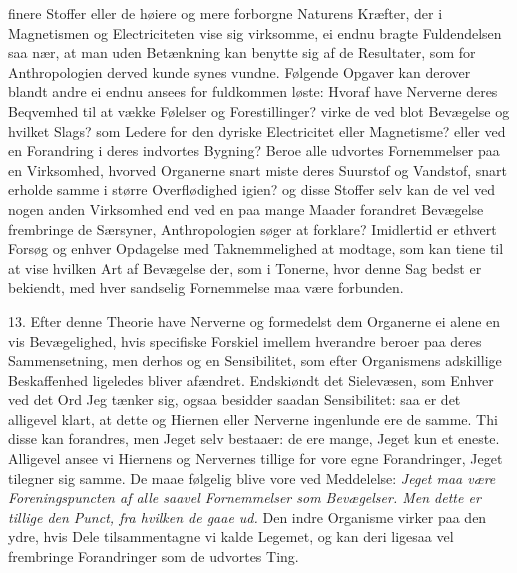 \documentclass[12pt,a4paper]{article}
\newcommand{\opage}[1]{\marginnote{\footnotesize\textit{[#1]}}}
\begin{document}
finere Stoffer eller de høiere og mere forborgne Naturens Kræfter, der i Magnetismen og
Electriciteten vise sig virksomme, ei endnu bragte Fuldendelsen saa nær, at man uden
Betænkning kan benytte sig af de Resultater, som for Anthropologien derved kunde synes
vundne. Følgende Opgaver kan derover blandt andre ei endnu ansees for fuldkommen løste:
Hvoraf have Nerverne deres Beqvemhed til at vække Følelser og Forestillinger? virke de
ved blot Bevægelse og hvilket Slags? som Ledere for den dyriske
\opage{81} Electricitet eller Magnetisme? eller ved en Forandring i deres indvortes Bygning? Beroe
alle udvortes Fornemmelser paa en Virksomhed, hvorved Organerne snart miste deres
Suurstof og Vandstof, snart erholde samme i større Overflødighed igien? og disse Stoffer
selv kan de vel ved nogen anden Virksomhed end ved en paa mange Maader forandret
Bevægelse frembringe de Særsyner, Anthropologien søger at forklare? Imidlertid er
ethvert Forsøg og enhver Opdagelse med Taknemmelighed at modtage, som kan tiene til at
vise hvilken Art af Bevægelse der, som i Tonerne, hvor denne Sag bedst er bekiendt, med
hver sandselig Fornemmelse maa være forbunden.

13. Efter denne Theorie have Nerverne og formedelst dem Organerne ei alene en vis
Bevægelighed, hvis specifiske Forskiel imellem hverandre beroer paa deres
Sammensetning, men derhos og en Sensibilitet, som efter Organismens adskillige
Beskaffenhed ligeledes bliver afændret. Endskiøndt det Sielevæsen, som Enhver ved det
Ord Jeg tænker sig, ogsaa besidder saadan Sensibilitet: saa er det alligevel klart, at
dette og Hiernen eller Nerverne ingenlunde ere de samme. Thi disse kan forandres, men
Jeget selv bestaaer: de ere mange, Jeget kun et eneste. Alligevel ansee vi Hiernens og
Nervernes tillige for vore egne Forandringer, Jeget tilegner sig samme. De maae følgelig
blive vore ved Meddelelse: \emph{Jeget maa være Foreningspuncten af
\opage{82} alle saavel Fornemmelser som Bevægelser. Men dette er tillige den Punct, fra hvilken de
gaae ud.} Den indre Organisme virker paa den ydre, hvis Dele tilsammentagne vi kalde
Legemet, og kan deri ligesaa vel frembringe Forandringer som de udvortes Ting.
\end{document}
